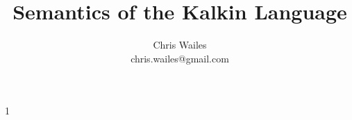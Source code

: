 \documentclass[12pt]{article}
\begin{document}
\title{Semantics of the Kalkin Language}

\author{Chris Wailes \\ chris.wailes@gmail.com}

\maketitle

1
\end{document}

